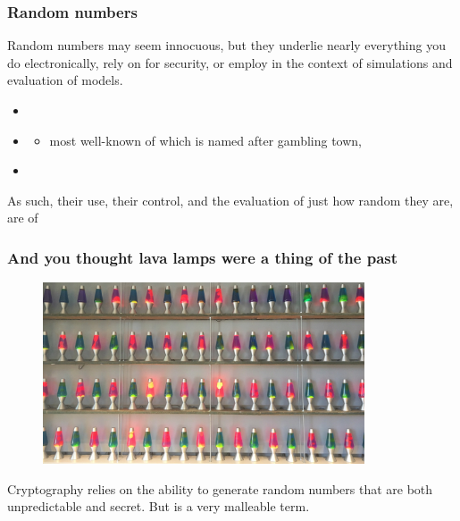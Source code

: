 \documentclass[hyperref={colorlinks=true}]{beamer}
\begin{document}
\begin{frame}%
  \frametitle{Random numbers}
  
  Random numbers may seem innocuous, but they underlie nearly everything you do electronically, rely on for security, or employ in the context of simulations and evaluation of models.
  
  \begin{itemize}
    \item {}
    \item {}
    \begin{itemize}
      \item  most well-known of which is named after gambling town, 
    \end{itemize}
    \item {}
  \end{itemize}

  As such, their use, their control, and the evaluation of just how random they are, are of 

\end{frame}


\begin{frame}%
  \frametitle{And you thought lava lamps were a thing of the past}
  
  \begin{figure}
    \centering
    \includegraphics[width=0.85\textwidth]{LavaLamps.jpg}
  \end{figure}

  Cryptography relies on the ability to generate random numbers that are both unpredictable and  secret. But  is a very malleable term. 

\end{frame}
\end{document}
